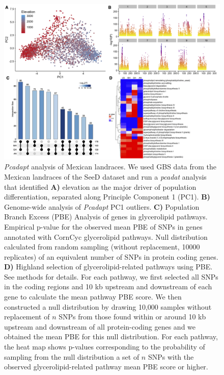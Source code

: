 \documentclass[9pt,twocolumn,twoside,lineno]{BioRxiv}
\begin{document}
\begin{figure}[t]
\begin{center}
\includegraphics[width=0.9\paperwidth]{Sup_Figures/Sup_Fig_1.png}
\caption{\textit{Pcadapt} analysis of Mexican landraces. We used GBS data from the Mexican landraces of the SeeD dataset \cite{Romero_Navarro2017-cn} and run a \textit{pcadat} analysis \cite{Luu2017-ws} that identified \textbf{A)} elevation as the major driver of population differentiation, separated along Principle Component 1 (PC1).  
\textbf{B)} Genome-wide analysis of \textit{Pcadapt} PC1 outliers. 
\textbf{C)} Population Branch Excess (PBE) Analysis of genes in glycerolipid pathways.
Empirical p-value for the observed mean PBE of SNPs in genes annotated with CornCyc glycerolipid pathways. Null distribution calculated from random sampling (without replacement, 10000 replicates) of an equivalent number of SNPs in protein coding genes.
\textbf{D)} Highland selection of glycerolipid-related pathways using PBE. See methods for details.
For each pathway, we first selected all SNPs in the coding regions and 10 kb upstream and downstream of each gene to calculate the mean pathway PBE score. 
We then constructed a null distribution by drawing 10,000 samples without replacement of $n$ SNPs from those found within or around 10 kb upstream and downstream of all protein-coding genes and we obtained the mean PBE for this null distribution. 
For each pathway, the heat map shows p-values corresponding to the probability of sampling from the null distribution a set of $n$ SNPs with the observed glycerolipid-related pathway mean PBE score or higher. 
}
\label{SupFig1}
\end{center}
\end{figure} 
\end{document}
